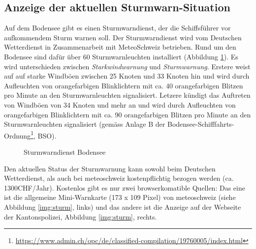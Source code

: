\subsection{Anzeige der aktuellen Sturmwarn-Situation}
\label{subsec:sturmwarnung}

Auf dem Bodensee gibt es einen Sturmwarndienst, der die Schiffsführer vor aufkommendem Sturm warnen soll. Der Sturmwarndienst wird vom Deutschen Wetterdienst in Zusammenarbeit mit MeteoSchweiz betrieben. Rund um den Bodensee sind dafür über 60 Sturmwarnleuchten installiert (Abbildung \ref{img:sturm2}). Es wird unterschieden zwischen \textit{Starkwindwarnung} und \textit{Sturmwarnung}. Erstere weist auf auf starke Windböen zwischen 25 Knoten und 33 Knoten hin und wird durch Aufleuchten von orangefarbigen Blinklichtern mit ca. 40 orangefarbigen Blitzen pro Minute an den Sturmwarnleuchten signalisiert. Letzere kündigt das Auftreten von Windböen von 34 Knoten und mehr an und wird durch Aufleuchten von orangefarbigen Blinklichtern mit ca. 90 orangefarbigen Blitzen pro Minute an den Sturmwarnleuchten signalisiert (gemäss Anlage B der Bodensee-Schifffahrts-Ordnung\footnote{ \url{https://www.admin.ch/opc/de/classified-compilation/19760005/index.html}}, BSO).

\begin{figure}[h!]
	\centering
	\caption{Sturmwarndienst Bodensee}
	\label{img:sturm2}
\end{figure}

Den aktuellen Status der Sturmwarnung kann sowohl beim Deutschen Wetterdienst, als auch bei meteoschweiz kostenpflichtig bezogen werden (ca. 1300CHF/Jahr). Kostenlos gibt es nur zwei browserkomatible Quellen: Das eine ist die allgemeine Mini-Warnkarte (173 x 109 Pixel) von meteoschweiz (siehe Abbildung \ref{img:sturm}, links) und das andere ist die Anzeige auf der Webseite der Kantonspolizei, Abbildung \ref{img:sturm}, rechts.

